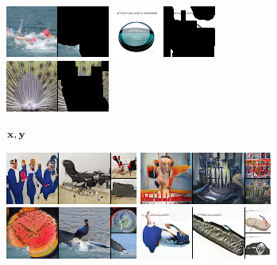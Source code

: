 \begin{figure}[t]
\begin{subfigure}[t]{0.15\textwidth}
      \includegraphics[height=\imagenetimgheight]{figs/cigcvae/image-samples/imagenet64/freeform_aipo_2_gt_masked.png}
      \includegraphics[height=\imagenetimgheight]{figs/cigcvae/image-samples/imagenet64/freeform_aipo_3_gt_masked.png}
      \includegraphics[height=\imagenetimgheight]{figs/cigcvae/image-samples/imagenet64/freeform_aipo_4_gt_masked.png}
      \caption*{$\mathbf{x}, \mathbf{y}$}
    \end{subfigure}
    \begin{subfigure}[t]{0.2\textwidth}
      \centering
      \includegraphics[height=\imagenetimgheight]{figs/cigcvae/image-samples/imagenet64/freeform_co_mod_gan_0_samples.png}
      \includegraphics[height=\imagenetimgheight]{figs/cigcvae/image-samples/imagenet64/freeform_co_mod_gan_1_samples.png}
      \includegraphics[height=\imagenetimgheight]{figs/cigcvae/image-samples/imagenet64/freeform_co_mod_gan_2_samples.png}
      \includegraphics[height=\imagenetimgheight]{figs/cigcvae/image-samples/imagenet64/freeform_co_mod_gan_3_samples.png}

\end{subfigure}
\end{figure}
